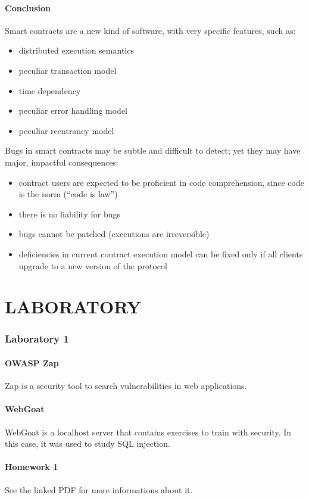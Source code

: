 \documentclass[a4paper, 10pt, titlepage]{article}
\begin{document}
\subsection{Conclusion}
Smart contracts are a new kind of software, with very specific features, such as:
\begin{itemize}
\item distributed execution semantics
\item peculiar transaction model
\item time dependency
\item peculiar error handling model
\item peculiar reentrancy model
\end{itemize}
Bugs in smart contracts may be subtle and difficult to detect; yet they may have major, impactful consequences:
\begin{itemize}
\item contract users are expected to be proficient in code comprehension, since code is the norm (“code is law”)
\item there is no liability for bugs
\item bugs cannot be patched (executions are irreversible)
\item deficiencies in current contract execution model can be fixed only if all clients upgrade to a new version of the protocol
\end{itemize}




	
\newpage	
\part{LABORATORY}
\newpage
\section{Laboratory 1}
\subsection{OWASP Zap}
Zap is a security tool to search vulnerabilities in web applications.
\subsection{WebGoat}
WebGoat is a localhost server that contains exercises to train with security. In this case, it was used to study SQL injection.
\subsection{Homework 1}
See the linked PDF for more informations about it. 
\end{document}
